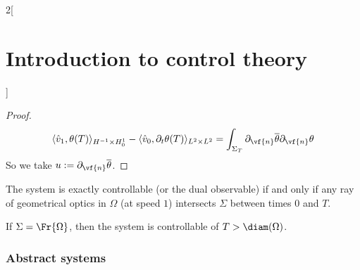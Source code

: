 \documentclass[../../../main_math.tex]{subfiles}
\begin{document}
\begin{multicols}{2}[\section{Introduction to control theory}]
\begin{proof}
    $$
      \langle \hat{v}_1,\theta(T)\rangle_{H^{-1}\times H_0^1}-\langle \hat{v}_0,\partial_t\theta(T)\rangle_{L^2\times L^2}=\int_{\Sigma_T}\partial_{\vf{n}}\overline{\theta}\partial_{\vf{n}}\theta
    $$
    So we take $u:=\partial_{\vf{n}}\overline{\theta}$.
  \end{proof}
  \begin{theorem}
    The system is exactly controllable (or the dual observable) if and only if any ray of geometrical optics in $\Omega$ (at speed $1$) intersects $\Sigma$ between times $0$ and $T$.
  \end{theorem}
  \begin{remark}
    If $\Sigma=\Fr{\Omega}$, then the system is controllable of $T>\diam(\Omega)$.
  \end{remark}
  \subsubsection{Abstract systems}
\end{multicols}
\end{document}
